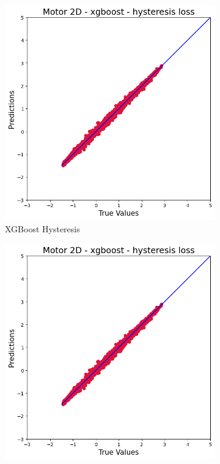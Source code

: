 \documentclass{article}
\begin{document}
\begin{figure}[!htbp]
    \vspace{0.3cm}
    
    \begin{subfigure}[b]{0.23\textwidth}
        \centering
        \includegraphics[width=\textwidth]{images/2D/xgboost_hysteresis.png}
        \caption{XGBoost Hysteresis}
    \end{subfigure}
    \hfill
    \begin{subfigure}[b]{0.23\textwidth}
        \centering
        \includegraphics[width=\textwidth]{images/2D/xgboost_joule.png}

\end{subfigure}
\end{figure}
\end{document}
